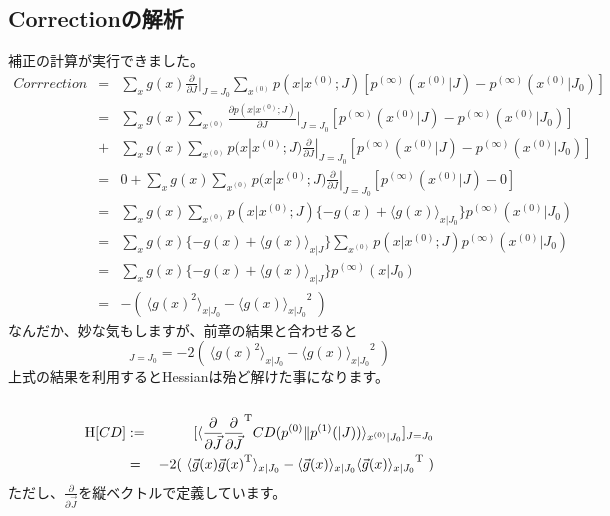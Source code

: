 \documentclass[11pt]{article}
\begin{document}
\subsection{Correctionの解析}
補正の計算が実行できました。\\
\begin{eqnarray}
Corrrection&=&\sum_{x}g(x)\frac{\partial}{\partial J}|_{J=J_0}\sum_{x^{(0)}}p(x|x^{(0)};J)[p^{(\infty)}(x^{(0)}|J)-p^{(\infty)}(x^{(0)}|J_0)]\\
&=&\sum_{x}g(x)\sum_{x^{(0)}}\frac{\partial p(x|x^{(0)};J)}{\partial J}|_{J=J_0}[p^{(\infty)}(x^{(0)}|J)-p^{(\infty)}(x^{(0)}|J_0)]\\
&+&\sum_{x}g(x)\sum_{x^{(0)}}p(x|x^{(0)};J)\frac{\partial}{\partial J}|_{J=J_0}[p^{(\infty)}(x^{(0)}|J)-p^{(\infty)}(x^{(0)}|J_0)]\nonumber \\
	&=&0+\sum_{x}g(x)\sum_{x^{(0)}}p(x|x^{(0)};J)\frac{\partial}{\partial J}|_{J=J_0}[p^{(\infty)}(x^{(0)}|J)-0]\\
	&=&\sum_{x}g(x)\sum_{x^{(0)}}p(x|x^{(0)};J)\{-g(x)+\langle g(x) \rangle_{x|J_0} \} p^{(\infty)}(x^{(0)}|J_0)\\
	&=&\sum_{x}g(x)\{-g(x)+\langle g(x) \rangle_{x|J} \}\sum_{x^{(0)}}p(x|x^{(0)};J) p^{(\infty)}(x^{(0)}|J_0)\\
	&=&\sum_{x}g(x)\{-g(x)+\langle g(x) \rangle_{x|J} \} p^{(\infty)}(x|J_0)\\
	&=&-(\ \langle g(x)^2 \rangle_{x|J_0}-{\langle g(x) \rangle_{x|J_0}}^2 \  )
\end{eqnarray}
なんだか、妙な気もしますが、前章の結果と合わせると\\
\begin{equation}
	[\langle\frac{\partial^2}{\partial J^2}CD(p^{(0)}\|p^{(1)}(|J)) \rangle_{x^{(0)}|J_0}]_{J=J_0}=-2(\ \langle g(x)^2 \rangle_{x|J_0}-{\langle g(x) \rangle_{x|J_0}}^2 \  )
\end{equation}
上式の結果を利用するとHessianは殆ど解けた事になります。\\
\\
\begin{eqnarray}
	{\rm H}[CD]&:=&[\langle\frac{\partial}{\partial {\vec J}}{\frac{\partial}{\partial {\vec J}}}^{\rm T}CD(p^{(0)}\|p^{(1)}(|J)) \rangle_{x^{(0)}|J_0}]_{J=J_0}\\ 
	&=&-2(\ \langle {\vec g(x)} {\vec g(x)}^{\rm T}\rangle_{x|J_0}-{\langle {\vec g(x)} \rangle_{x|J_0}}{\langle {\vec g(x)} \rangle_{x|J_0}}^{\rm T} \  )
\end{eqnarray}
ただし、$\frac{\partial}{\partial {\vec J}}$を縦ベクトルで定義しています。\\
\end{document}

